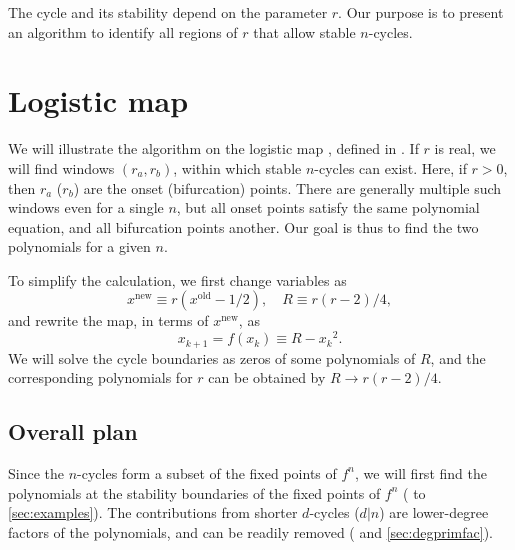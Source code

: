 \documentclass[twocolumn]{revtex4-1}
\begin{document}
The cycle and its stability depend on the parameter $r$.
%
Our purpose is to present an algorithm to identify
  all regions of $r$ that allow stable $n$-cycles.








\section{\label{sec:logmap}Logistic map}


We will illustrate the algorithm on the logistic map \cite{may, strogatz},
  defined in .
If $r$ is real,
  we will find windows $(r_a, r_b)$,
    within which stable $n$-cycles can exist.
%
Here, if $r > 0$, then
  $r_a$ ($r_b$) are the onset (bifurcation) points.
%
There are generally multiple such windows even for a single $n$,
but all onset points satisfy the same polynomial equation,
  and all bifurcation points another.
%
Our goal is thus to find the two polynomials for a given $n$.


To simplify the calculation, we first change variables \cite{saha} as
%
\[
    x^{\mathrm{new}} \equiv r(x^{\mathrm{old}} - 1/2),
    \quad R \equiv r(r-2)/4,
\]
%
and rewrite the map, in terms of $x^{\mathrm{new}}$, as
%
\begin{equation}
  x_{k+1} = f(x_k) \equiv R - {x_k}^2.
\label{eq:logmaps}
\end{equation}
%
%
We will solve the cycle boundaries as zeros of some polynomials of $R$,
and the corresponding polynomials for $r$ can be obtained by $R \rightarrow r(r-2)/4$.
%
%






\subsection{Overall plan}

Since the $n$-cycles form a subset of the fixed points of $f^n$,
we will first find
  the polynomials at the stability boundaries of
  the fixed points of $f^n$
  ( to \ref{sec:examples}).
The contributions from shorter $d$-cycles ($d|n$)
  are lower-degree factors of the polynomials,
  and can be readily removed
  ( and \ref{sec:degprimfac}).
\end{document}
